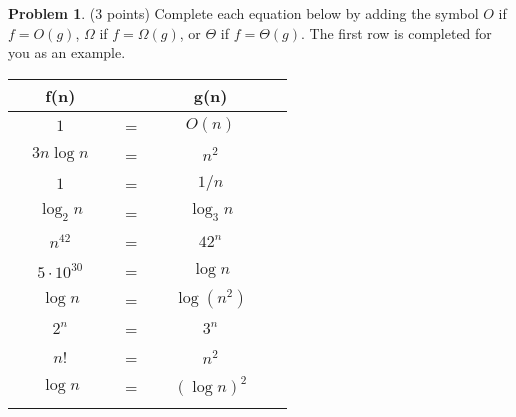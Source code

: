\documentclass[10pt]{article}
\theoremstyle{definition}
\newtheorem{problem}{Problem}
\begin{document}
\newpage
\begin{problem}
(3 points)
    Complete each equation below by adding the symbol $O$ if $f=O(g)$, $\Omega$ if $f=\Omega(g)$, or $\Theta$ if $f=\Theta(g)$.  
    The first row is completed for you as an example.

{\renewcommand{\arraystretch}{4.4}
\begin{tabular}{c c c c c c}
    & f(n) &~\hspace{0.5in}~$ $~\hspace{0.5in}~& g(n) &\\
    \hline
    & $1$ & ~\hspace{0.5in}~$=$~\hspace{0.5in}~  & $O(n)$ &  &\\
    \arrayrulecolor{gray}\hline
    & $3 n\log n$ & ~\hspace{0.5in}~$=$~\hspace{0.5in}~  & $n^2$ &  &\\
    \arrayrulecolor{gray}\hline
    & $1$ & ~\hspace{0.5in}~$=$~\hspace{0.5in}~  & $1/n$ &  &\\
    \arrayrulecolor{gray}\hline
    & $\log_2 n$ & ~\hspace{0.5in}~$=$~\hspace{0.5in}~  & $\log_3 n$ &  &\\
    \arrayrulecolor{gray}\hline
    & $n^{42}$ & ~\hspace{0.5in}~$=$~\hspace{0.5in}~  & $42^n$ &  &\\
    \arrayrulecolor{gray}\hline
    & $5\cdot10^{30}$ & ~\hspace{0.5in}~$=$~\hspace{0.5in}~  & $\log n$ &  &\\
    \arrayrulecolor{gray}\hline
    & $\log n$ & ~\hspace{0.5in}~$=$~\hspace{0.5in}~  & $\log (n^2)$ &  &\\
    \arrayrulecolor{gray}\hline
    & $2^n$ & ~\hspace{0.5in}~$=$~\hspace{0.5in}~  & $3^n$ &  &\\
    \arrayrulecolor{gray}\hline
    & $n!$ & ~\hspace{0.5in}~$=$~\hspace{0.5in}~  & $n^2$ &  &\\
    \arrayrulecolor{gray}\hline
    & $\log n$ & ~\hspace{0.5in}~$=$~\hspace{0.5in}~  & $(\log n)^2$ &  &\\
    \arrayrulecolor{gray}\hline


\end{tabular}}
\end{problem}
\end{document}
